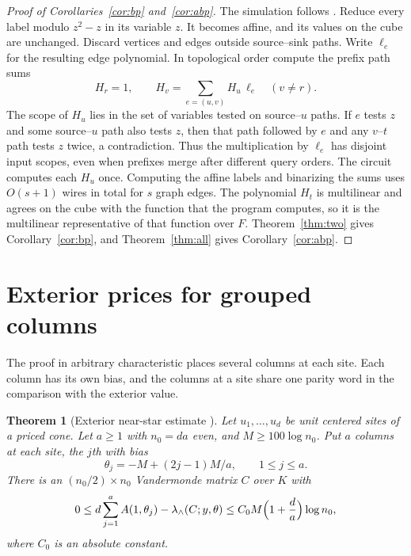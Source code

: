 \documentclass[11pt]{article}
\newtheorem{theorem}{Theorem}
\theoremstyle{remark}
\newcommand{\lamext}{\lambda_\wedge}
\begin{document}
\begin{proof}[Proof of Corollaries~\ref{cor:bp} and~\ref{cor:abp}]
The simulation follows \cite[Claim 2.6]{volk}. Reduce every label modulo
\(z^2-z\) in its variable \(z\). It becomes affine, and its values on the
cube are unchanged. Discard vertices and edges outside source--sink
paths. Write \(\ell_e\) for the resulting edge polynomial. In topological
order compute the prefix path sums
\[
       H_r=1,\qquad H_v=\sum_{e=(u,v)} H_u\,\ell_e\quad(v\ne r).
\]
The scope of \(H_u\) lies in the set of variables tested on source--\(u\)
paths. If \(e\) tests \(z\) and some source--\(u\) path also tests \(z\),
then that path followed by \(e\) and any \(v\)--\(t\) path tests \(z\)
twice, a contradiction. Thus the multiplication by \(\ell_e\) has disjoint input
scopes, even when prefixes merge after different query orders. The circuit
computes each \(H_u\) once. Computing the affine labels and binarizing the
sums uses \(O(s+1)\) wires in total for \(s\) graph edges. The polynomial
\(H_t\) is multilinear and agrees on the cube with the function that the
program computes, so it is the multilinear representative of that
function over \(F\). Theorem~\ref{thm:two} gives
Corollary~\ref{cor:bp}, and Theorem~\ref{thm:all} gives
Corollary~\ref{cor:abp}.
\end{proof}

\section{Exterior prices for grouped columns}\label{sec:exterior}
The proof in arbitrary characteristic places several columns at each
site. Each column has its own bias, and the columns at a site share one
parity word in the comparison with the exterior value.

\begin{theorem}[Exterior near-star estimate {\cite[Theorem 8.1]{hc}}]
\label{thm:star}
Let \(u_1,\ldots,u_d\) be unit centered sites of a priced cone. Let
\(a\ge1\) with \(n_0=da\) even, and \(M\ge100\log n_0\). Put \(a\) columns
at each site, the \(j\)th with bias
\begin{equation}\label{eq:grid}
 \theta_j=-M+(2j-1)M/a,\qquad1\le j\le a .
\end{equation}
There is an \((n_0/2)\times n_0\) Vandermonde matrix \(C\) over \(K\)
with
\[
 0\le d\sum_{j=1}^aA(1,\theta_j)-\lamext(C;y,\theta)
  \le C_0M\Bigl(1+\frac da\Bigr)\log n_0 ,
\]
where \(C_0\) is an absolute constant.
\end{theorem}
\end{document}
